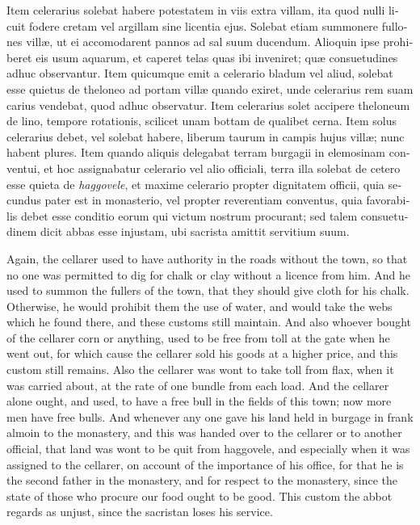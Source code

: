 \documentclass[10pt]{book}
\begin{document}
\begin{paracol}{2}
\switchcolumn*

\begin{otherlanguage}{latin}
Item celerarius solebat habere potestatem in viis extra villam, ita quod nulli licuit fodere cretam vel argillam sine licentia ejus. Solebat etiam summonere fullones vill\ae{}, ut ei accomodarent pannos ad sal suum ducendum. Alioquin ipse prohiberet eis usum aquarum, et caperet telas quas  ibi inveniret; qu\ae{} consuetudines adhuc observantur. Item quicumque emit a celerario bladum vel aliud,  solebat esse quietus de theloneo ad portam vill\ae{} quando exiret, unde celerarius rem suam carius vendebat, quod adhuc observatur. Item celerarius solet accipere theloneum de lino, tempore rotationis, scilicet unam bottam de qualibet cerna. Item solus celerarius debet, vel solebat habere, liberum taurum in campis hujus vill\ae{}; nunc habent plures. Item quando aliquis delegabat terram burgagii in elemosinam conventui, et hoc assignabatur celerario vel alio officiali, terra illa solebat de cetero esse quieta de \emph{haggovele}, et maxime celerario propter dignitatem officii, quia secundus pater est in monasterio, vel propter reverentiam conventus, quia favorabilis debet esse conditio eorum qui victum nostrum procurant; sed talem consuetudinem dicit abbas esse injustam, ubi sacrista amittit servitium suum. 
\end{otherlanguage}

\switchcolumn

Again, the cellarer used to have authority in the roads without the town, so that no one was permitted to dig for chalk or clay without a licence from him. And he used to summon the fullers of the town, that they should give cloth for his chalk. Otherwise, he would prohibit them the use of water, and would take the webs which he found there, and these customs still maintain. And also whoever bought of the cellarer corn or anything, used to be free from toll at the gate when he went out, for which cause the cellarer sold his goods at a higher price, and this custom still remains. Also the cellarer was wont to take toll from flax, when it was carried about, at the rate of one bundle from each load. And the cellarer alone ought, and used, to have a free bull in the fields of this town; now more men have free bulls. And whenever any one gave his land held in burgage in frank almoin to the monastery, and this was handed over to the cellarer or to another official, that land was wont to be quit from haggovele, and especially when it was assigned to the cellarer, on account of the importance of his office, for that he is the second father in the monastery, and for respect to the monastery, since the state of those who procure our food ought to be good. This custom the abbot regards as unjust, since the sacristan loses his service.


\end{paracol}
\end{document}
